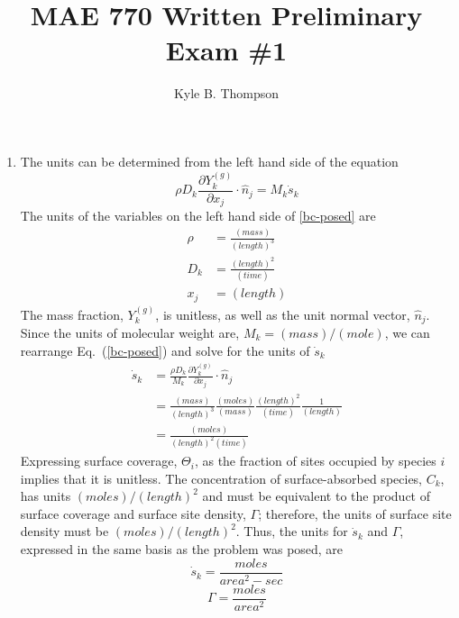 \documentclass{report}
\title{MAE 770 Written Preliminary Exam \#1}
\author{ Kyle B. Thompson }
\newcommand{\eref}[1]{Eq.~(\ref{#1})}
\newcommand{\sk}{\dot{s}_k}
\begin{document}
\maketitle



\begin{enumerate}[label=(\alph*)]
  \item The units can be determined from the left hand side of the equation
    \begin{equation}
      \rho D_k \frac{\partial Y_k^{(g)}}{\partial x_j} \cdot \hat{n}_j = M_k \sk
      \label{bc-posed}
    \end{equation}
  The units of the variables on the left hand side of \ref{bc-posed} are
  \begin{align*}
    \rho &= \frac{(mass)}{(length)^3} \\
    D_k &= \frac{(length)^2}{(time)} \\
    x_j &= (length)
  \end{align*}
  The mass fraction, $Y_k^{(g)}$, is unitless, as well as the unit normal vector,
  $\hat{n}_j$. Since the units of molecular weight are, $M_k = (mass)/(mole)$, we can
  rearrange \eref{bc-posed} and solve for the units of $\sk$
  \begin{equation}
    \label{units sdot}
    \begin{aligned}
      \sk &= \frac{\rho D_k}{M_k}\frac{\partial Y_k^{(g)}}{\partial x_j}\cdot \hat{n}_j \\
      &= \frac{(mass)}{(length)^3} \frac{(moles)}{(mass)} \frac{(length)^2}{(time)}\frac{1}{(length)} \\
      &= \frac{(moles)}{(length)^2 (time)}
    \end{aligned}
  \end{equation}
  Expressing surface coverage, $\Theta_i$, as the fraction of sites occupied by
  species $i$ implies that it is unitless.  The concentration of
  surface-absorbed species, $C_k$, has units $(moles)/(length)^2$ and must be equivalent to
  the product of surface coverage and surface site density, $\Gamma$; therefore,
  the units of surface site density must be $(moles)/(length)^2$.  Thus, the units for $\sk$
  and $\Gamma$, expressed in the same basis as the problem was posed, are
  \[
    \boxed{\sk = \frac{moles}{area^2-sec}}
  \]
  \[
    \boxed{\Gamma = \frac{moles}{area^2}}
  \]


\end{enumerate}
\end{document}

